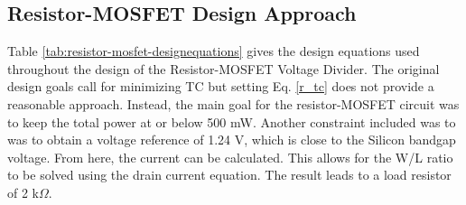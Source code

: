 \documentclass[conference]{IEEEtran}
\begin{document}
\subsection{Resistor-MOSFET Design Approach} 
Table \ref{tab:resistor-mosfet-designequations} gives the design equations used throughout the design of the Resistor-MOSFET Voltage Divider.  The original design goals call for minimizing TC but setting Eq. \ref{r_tc} does not provide a reasonable approach.  Instead, the main goal for the resistor-MOSFET circuit was to keep the total power at or below 500 mW.  Another constraint included was to was to obtain a voltage reference of 1.24 V, which is close to the Silicon bandgap voltage.  From here, the current can be calculated.  This allows for the W/L ratio to be solved using the drain current equation.  The result leads to a load resistor of 2 k$\Omega$.
\end{document}
